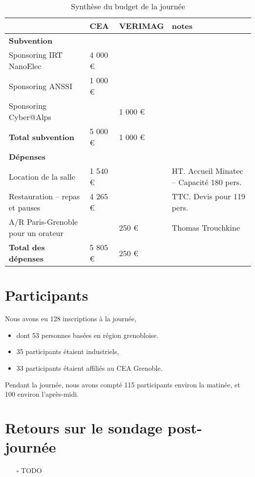 \documentclass[a4paper,11pt]{article}
\begin{document}
\begin{table}[h]
\caption{\label{tab:org62ef81c}
Synthèse du budget de la journée}
\centering
\begin{tabular}{llll}
\hline
 & CEA & VERIMAG & notes\\
\hline
\textbf{Subvention} &  &  & \\
\hline
Sponsoring IRT NanoElec & 4 000 € &  & \\
Sponsoring ANSSI & 1 000 € &  & \\
Sponsoring Cyber@Alps &  & 1 000 € & \\
\hline
\textbf{Total subvention} & 5 000 € & 1 000 € & \\
\hline
\hline
\textbf{Dépenses} &  &  & \\
\hline
Location de la salle & 1 540 € &  & HT. Accueil Minatec – Capacité 180 pers.\\
Restauration – repas et pauses & 4 265 € &  & TTC. Devis pour 119 pers.\\
A/R Paris-Grenoble pour un orateur &  & 250 € & Thomas Trouchkine\\
\hline
\textbf{Total des dépenses} & 5 805 € & 250 € & \\
\hline
\end{tabular}
\end{table}

\section{Participants}
\label{sec:org9b6e74a}

Nous avons eu 128 inscriptions à la journée,
\begin{itemize}
\item dont 53 personnes basées en région grenobloise.
\item 35 participants étaient industriels,
\item 33 participants étaient affiliés au CEA Grenoble.
\end{itemize}

Pendant la journée, nous avons compté 115 participants environ la
matinée, et 100 environ l'après-midi.

\section{Retours sur le sondage post-journée}
\label{sec:org17b494b}

\begin{itemize}
\item[{$\square$}] TODO
\end{itemize}
\end{document}
